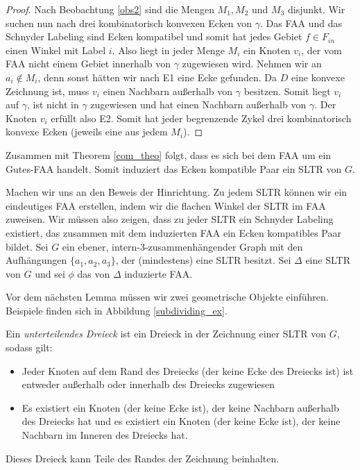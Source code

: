 \begin{proof}
Nach Beobachtung \ref{obs2} sind die Mengen $M_1,M_2$ und $M_3$ disjunkt. Wir suchen nun nach drei kombinatorisch konvexen Ecken von $\gamma$. Das FAA und das Schnyder Labeling sind Ecken kompatibel und somit hat jedes Gebiet $f \in F_{in}$ einen Winkel mit Label $i$. Also liegt in jeder Menge $M_i$ ein Knoten $v_i$, der vom FAA nicht einem Gebiet innerhalb von $\gamma$ zugewiesen wird. Nehmen wir an $a_i \notin M_i$, denn sonst hätten wir nach E1 eine Ecke gefunden. Da $D$ eine konvexe Zeichnung ist, muss $v_i$ einen Nachbarn außerhalb von $\gamma$ besitzen. Somit liegt $v_i$ auf $\gamma$, ist nicht in $\gamma$ zugewiesen und hat einen Nachbarn außerhalb von $\gamma$. Der Knoten $v_i$ erfüllt also E2. Somit hat jeder begrenzende Zykel drei kombinatorisch konvexe Ecken (jeweils eine aus jedem $M_i$).
\end{proof}

Zusammen mit Theorem \ref{com_theo} folgt, dass es sich bei dem FAA um ein Gutes-FAA handelt. Somit induziert das Ecken kompatible Paar ein SLTR von $G$.

Machen wir uns an den Beweis der Hinrichtung. Zu jedem SLTR können wir ein eindeutiges FAA erstellen, indem wir die flachen Winkel der SLTR im FAA zuweisen. Wir müssen also zeigen, dass zu jeder SLTR ein Schnyder Labeling existiert, das zusammen mit dem induzierten FAA ein Ecken kompatibles Paar bildet. Sei $G$ ein ebener, intern-3-zusammenhängender Graph mit den Aufhängungen $\{a_1,a_2,a_3\}$, der (mindestens) eine SLTR besitzt. Sei $\Delta$ eine SLTR von $G$ und sei $\phi$ das von $\Delta$ induzierte FAA.

Vor dem nächsten Lemma müssen wir zwei geometrische Objekte einführen. Beispiele finden sich in Abbildung \ref{subdividing_ex}.

\begin{definition}
Ein \textit{unterteilendes Dreieck} ist ein Dreieck in der Zeichnung einer SLTR von $G$, sodass gilt:
\begin{itemize}
\item Jeder Knoten auf dem Rand des Dreiecks (der keine Ecke des Dreiecks ist) ist entweder außerhalb oder innerhalb des Dreiecks zugewiesen
\item Es existiert ein Knoten (der keine Ecke ist), der keine Nachbarn außerhalb des Dreiecks hat und es existiert ein Knoten (der keine Ecke ist), der keine Nachbarn im Inneren des Dreiecks hat.
\end{itemize}
Dieses Dreieck kann Teile des Randes der Zeichnung beinhalten.
\end{definition}

